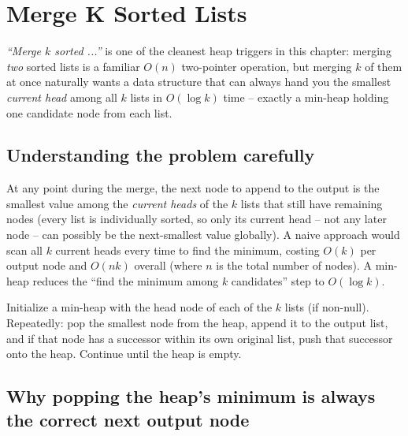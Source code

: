 \section{Merge K Sorted Lists}
\label{sec:heap-merge-k-lists}


\begin{patternbox}
\emph{``Merge $k$ sorted ...''} is one of the cleanest heap triggers in
this chapter: merging \emph{two} sorted lists is a familiar $O(n)$
two-pointer operation, but merging $k$ of them at once naturally wants a
data structure that can always hand you the smallest \emph{current head}
among all $k$ lists in $O(\log k)$ time -- exactly a min-heap holding one
candidate node from each list.
\end{patternbox}

\subsection*{Understanding the problem carefully}

At any point during the merge, the next node to append to the output is
the smallest value among the \emph{current heads} of the $k$ lists that
still have remaining nodes (every list is individually sorted, so only its
current head -- not any later node -- can possibly be the next-smallest
value globally). A naive approach would scan all $k$ current heads every
time to find the minimum, costing $O(k)$ per output node and $O(nk)$
overall (where $n$ is the total number of nodes). A min-heap reduces the
``find the minimum among $k$ candidates'' step to $O(\log k)$.

\begin{ideabox}
Initialize a min-heap with the head node of each of the $k$ lists (if
non-null). Repeatedly: pop the smallest node from the heap, append it to
the output list, and if that node has a successor within its own original
list, push that successor onto the heap. Continue until the heap is
empty.
\end{ideabox}

\subsection*{Why popping the heap's minimum is always the correct next output node}

